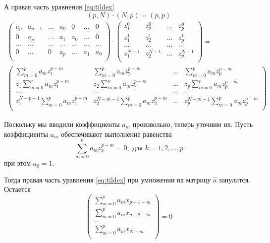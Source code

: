 \documentclass[a4paper,14pt]{extarticle}
\begin{document}
А правая часть уравнения \eqref{eq:tildex} 
\begin{equation}
    (p,N) \cdot (N,p) = (p,p) 
\end{equation}
\begin{multline}
    \begin{pmatrix}
        a_p & a_{p-1} & \dots & a_0 & 0 & \dots & 0 \\
        0  & a_{p} & \dots & a_1 & a_0 & \dots & 0 \\
        \dots & \dots & \dots & \dots & \dots & \dots & \dots\\
        0  & \dots &  0  & a_p & \dots  & a_1 & a_{0} \\
    \end{pmatrix}
    \cdot 
    \begin{pmatrix}
        z_1^0 & z_2^0 & \dots & z_p^0 \\ 
        z_1^1 & z_2^1 & \dots & z_p^1 \\ 
        \dots & \dots & \dots & \dots \\
        z_1^{N-1} & z_2^{N-1} & \dots & z_p^{N-1} \\ 
    \end{pmatrix}
    = \\
    \begin{pmatrix}
        \sum\limits_{m=0}^{p} a_m z_1^{p-m}&  \sum\limits_{m=0}^{p} a_m z_2^{p-m}& \dots & \sum\limits_{m=0}^{p} a_m z_p^{p-m}   \\ 
        z_1\sum\limits_{m=0}^{p} a_m z_1^{p-m}&  z_2\sum\limits_{m=0}^{p} a_m z_2^{p-m}& \dots & z_p\sum\limits_{m=0}^{p} a_m z_p^{p-m}   \\ 
        \dots & \dots & \dots & \dots \\
        z_1^{N-p-1}\sum\limits_{m=0}^{p} a_m z_1^{p-m}&
        z_2^{N-m-1}\sum\limits_{m=0}^{p} a_m z_2^{p-m}& \dots &
        z_p^{N-m-1}\sum\limits_{m=0}^{p} a_m z_p^{p-m}   \\ 
    \end{pmatrix}
\end{multline}

Поскольку мы вводили коэффициенты $a_m$ произвольно, теперь уточним их. Пусть
коэффициенты  $a_m$ обеспечивают выполнение равенства 
\begin{equation}
    \label{eq:poly}
    \sum\limits_{m=0}^{p} a_m z_k^{p-m} = 0, \text{ для } k = 1,2,\dots,p
\end{equation}
при этом $a_0=1$.

Тогда правая часть уравнения \eqref{eq:tildex} при умножении на матрицу $\hat
a$ занулится. Остается
 \begin{equation}
    \label{eq:ax}
    \begin{pmatrix}
        \sum\limits_{m=0}^{p} a_m x_{p+1-m} \\ 
        \sum\limits_{m=0}^{p} a_m x_{p+2-m} \\ 
        \dots \\ 
        \sum\limits_{m=0}^{p} a_m x_{N-m} \\ 
    \end{pmatrix}
    = 0 
\end{equation}
\end{document}
